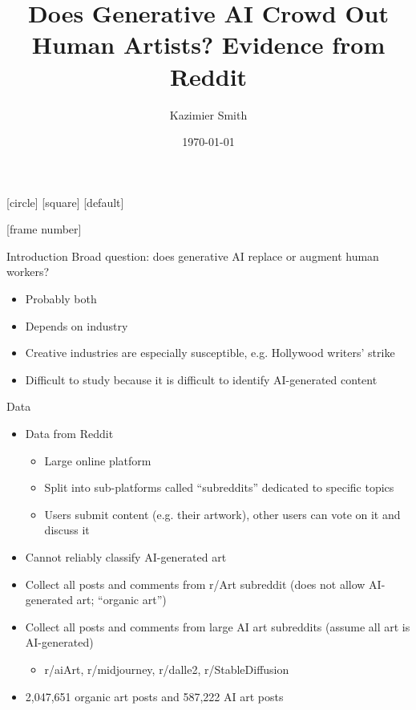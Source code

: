 \documentclass[aspectratio=169]{beamer}
\title{Does Generative AI Crowd Out Human Artists? Evidence from Reddit}
\author{Kazimier Smith}
\date{\today}
\begin{document}
[circle]
[square]
[default]
\beamertemplatenavigationsymbolsempty

	
\begin{frame}[noframenumbering]
\titlepage
\end{frame}

[frame number]

\begin{frame}{Introduction}
Broad question: does generative AI replace or augment human workers?
	\begin{itemize}
		\item Probably both
		\item Depends on industry
		\item Creative industries are especially susceptible,
			e.g. Hollywood writers' strike
		\item Difficult to study because it is difficult to identify AI-generated content
	\end{itemize}
\end{frame}

\begin{frame}{Data}
	\begin{itemize}
		\item Data from Reddit
			\begin{itemize}
				\item Large online platform
				\item Split into sub-platforms called ``subreddits'' dedicated to specific topics
				\item Users submit content (e.g. their artwork),
					other users can vote on it and discuss it
			\end{itemize}
		\item Cannot reliably classify AI-generated art
		\item Collect all posts and comments from r/Art subreddit
			(does not allow AI-generated art; ``organic art'')
		\item Collect all posts and comments from large AI art subreddits
			(assume all art is AI-generated)
		\begin{itemize}
			\item r/aiArt, r/midjourney, r/dalle2, r/StableDiffusion
		\end{itemize}
		\item 2,047,651 organic art posts and 587,222 AI art posts
	\end{itemize}
\end{frame}
\end{document}
